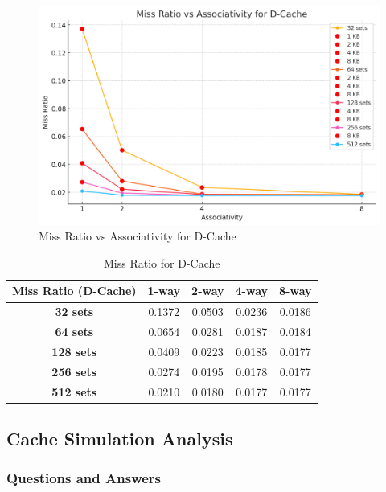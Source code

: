 \documentclass{article}
\begin{document}
\begin{figure}[H]
	\centering
	\includegraphics[scale=0.5]{dcache.png}
	\caption{Miss Ratio vs Associativity for D-Cache}
	\label{fig:dcache}
\end{figure}


\begin{table}[h]
	\centering
	\begin{tabular}{|c|c|c|c|c|}
		\hline
		\textbf{Miss Ratio (D-Cache)} & \textbf{1-way} & \textbf{2-way} & \textbf{4-way} & \textbf{8-way} \\ \hline
		\textbf{32 sets}  &       0.1372    &     0.0503       &        0.0236      &     0.0186        \\ \hline
		\textbf{64 sets}  &      0.0654       &      0.0281       &     0.0187       &       0.0184      \\ \hline
		\textbf{128 sets} &      0.0409       &       0.0223      &      0.0185       &      0.0177       \\ \hline
		\textbf{256 sets} &       0.0274      &      0.0195       &      0.0178       &      0.0177        \\ \hline
		\textbf{512 sets} &      0.0210       &      0.0180       &      0.0177       &     0.0177        \\ \hline
	\end{tabular}
	\caption{Miss Ratio for D-Cache}
	\label{tab:D-Cache}
\end{table}

\subsection{Cache Simulation Analysis}

\subsubsection{Questions and Answers}
\end{document}
